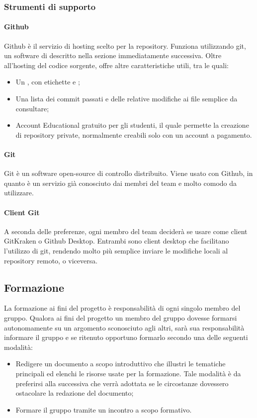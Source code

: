 \subsubsection{Strumenti di supporto}
\paragraph{Github}\Spazio
Github è il servizio di hosting scelto per la repository. Funziona utilizzando git, un software di  descritto nella sezione immediatamente successiva. Oltre all'hosting del codice sorgente, offre altre caratteristiche utili, tra le quali:
\begin{itemize}
\item Un , con etichette e ;
\item Una lista dei commit passati e delle relative modifiche ai file semplice da consultare;
\item Account Educational gratuito per gli studenti, il quale permette la creazione di repository private, normalmente creabili solo con un account a pagamento.
\end{itemize}

\paragraph{Git}\Spazio
Git è un software open-source di controllo  distribuito.
Viene usato con Github, in quanto è un servizio già conosciuto dai membri del team e molto comodo da utilizzare.

\paragraph{Client Git}\Spazio
A seconda delle preferenze, ogni membro del team deciderà se usare come client GitKraken o Github Desktop. Entrambi sono client desktop che facilitano l'utilizzo di git, rendendo molto più semplice inviare le modifiche locali al repository remoto, o viceversa.
\subsection{Formazione}
La formazione ai fini del progetto è responsabilità di ogni singolo membro del gruppo. Qualora ai fini del progetto un membro del gruppo dovesse formarsi autonomamente su un argomento sconosciuto agli altri, sarà sua responsabilità informare il gruppo e se ritenuto opportuno formarlo secondo una delle seguenti modalità:
\begin{itemize}
\item Redigere un documento a scopo introduttivo che illustri le tematiche principali ed
elenchi le risorse usate per la formazione. Tale modalità è da preferirsi alla successiva che verrà adottata se le circostanze dovessero ostacolare la redazione del documento;
\item Formare il gruppo tramite un incontro a scopo formativo.
\end{itemize}
\pagebreak
